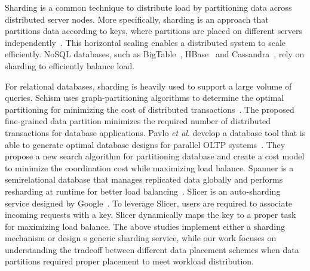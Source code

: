 Sharding is a common technique to distribute load by
partitioning data across distributed server nodes.
More specifically, sharding is an approach that partitions data
according to keys, where partitions are placed
on different servers independently~\cite{Cattell2011}.
This horizontal scaling enables a distributed system to scale efficiently.
NoSQL databases, such as BigTable~\cite{Chang2008}, HBase~\cite{hbase}
and Cassandra~\cite{Lakshman2010}, rely on sharding
to efficiently balance load.

For relational databases, sharding is heavily used to support
a large volume of queries.
Schism uses graph-partitioning algorithms
to determine the optimal partitioning
for minimizing the cost of distributed transactions~\cite{Curino2010}.
The proposed fine-grained data partition minimizes
the required number of distributed transactions for database applications.
Pavlo \emph{et al}. develop a database tool that is able to generate
optimal database designs for parallel OLTP systems~\cite{Pavlo2012}.
They propose a new search algorithm for partitioning database and
create a cost model to minimize the coordination cost
while maximizing load balance.
Spanner is a semirelational database that
manages replicated data globally and performs resharding
at runtime for better load balancing~\cite{Corbett2013}.
Slicer is an auto-sharding service designed by Google~\cite{Adya2016}.
To leverage Slicer, users are required to
associate incoming requests with a key.
Slicer dynamically maps the key to a proper task
for maximizing load balance.
The above studies implement either
a sharding mechanism or design s generic sharding service,
while our work focuses on understanding the tradeoff
between different data placement schemes
when data partitions required proper placement to
meet workload distribution.
